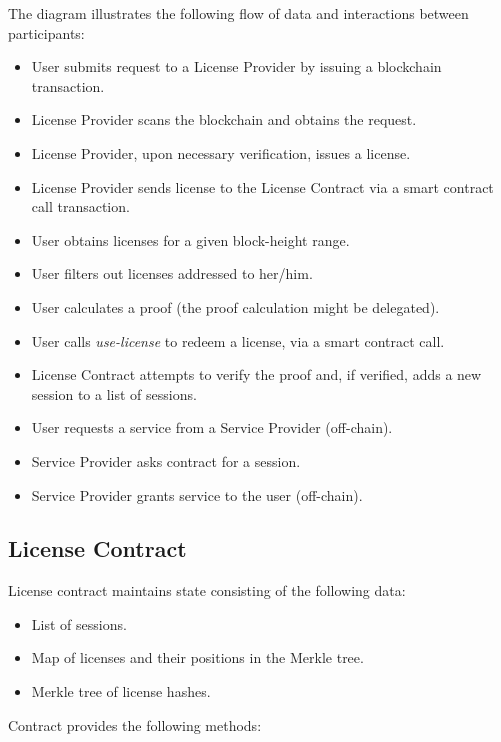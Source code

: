 The diagram illustrates the following flow of data and interactions between participants:

\begin{itemize}%
	\item User submits request to a License Provider by issuing a blockchain transaction.
	\item License Provider scans the blockchain and obtains the request.
	\item License Provider, upon necessary verification, issues a license.
	\item License Provider sends license to the License Contract via a smart contract call transaction.
	\item User obtains licenses for a given block-height range.
	\item User filters out licenses addressed to her/him.
	\item User calculates a proof (the proof calculation might be delegated).
	\item User calls \textit{use-license} to redeem a license, via a smart contract call.
	\item License Contract attempts to verify the proof and, if verified, adds a new session to a list of sessions.
	\item User requests a service from a Service Provider (off-chain).
	\item Service Provider asks contract for a session.
	\item Service Provider grants service to the user (off-chain).
\end{itemize}


\subsection{License Contract}

\begin{flushleft}
License contract maintains state consisting of the following data:
\end{flushleft}

\begin{itemize}%
	\item List of sessions.
	\item Map of licenses and their positions in the Merkle tree.
	\item Merkle tree of license hashes.
\end{itemize}


\begin{flushleft}
Contract provides the following methods:
\end{flushleft}

